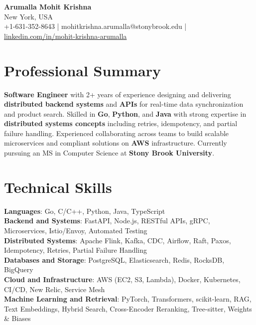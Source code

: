 \documentclass[letterpaper,11pt]{article}
\begin{document}
\begin{center}
  {\Large \textbf{Arumalla Mohit Krishna}} \\
  New York, USA \\
  +1-631-352-8643 \enspace | \enspace mohitkrishna.arumalla@stonybrook.edu \enspace | \enspace \href{https://www.linkedin.com/in/mohit-krishna-arumalla}{linkedin.com/in/mohit-krishna-arumalla}
\end{center}

\section{Professional Summary}
  \begin{itemize}[leftmargin=0.15in, label={}]
    \small{\item{
     \textbf{Software Engineer} with 2+ years of experience designing and delivering \textbf{distributed backend systems} and \textbf{APIs} for real-time data synchronization and product search. Skilled in \textbf{Go}, \textbf{Python}, and \textbf{Java} with strong expertise in \textbf{distributed systems concepts} including retries, idempotency, and partial failure handling. Experienced collaborating across teams to build scalable microservices and compliant solutions on \textbf{AWS} infrastructure. Currently pursuing an MS in Computer Science at \textbf{Stony Brook University}.
    }}
  \end{itemize}
\vspace{-16pt}

\section{Technical Skills}
 \begin{itemize}[leftmargin=0.15in, label={}]
    \small{\item{
     \textbf{Languages}: Go, C/C++, Python, Java, TypeScript \\
     \textbf{Backend and Systems}: FastAPI, Node.js, RESTful APIs, gRPC, Microservices, Istio/Envoy, Automated Testing \\
     \textbf{Distributed Systems}: Apache Flink, Kafka, CDC, Airflow, Raft, Paxos, Idempotency, Retries, Partial Failure Handling \\
     \textbf{Databases and Storage}: PostgreSQL, Elasticsearch, Redis, RocksDB, BigQuery \\
     \textbf{Cloud and Infrastructure}: AWS (EC2, S3, Lambda), Docker, Kubernetes, CI/CD, New Relic, Service Mesh \\
     \textbf{Machine Learning and Retrieval}: PyTorch, Transformers, scikit-learn, RAG, Text Embeddings, Hybrid Search, Cross-Encoder Reranking, Tree-sitter, Weights \& Biases
    }}
 \end{itemize}
\vspace{-16pt}
\end{document}
